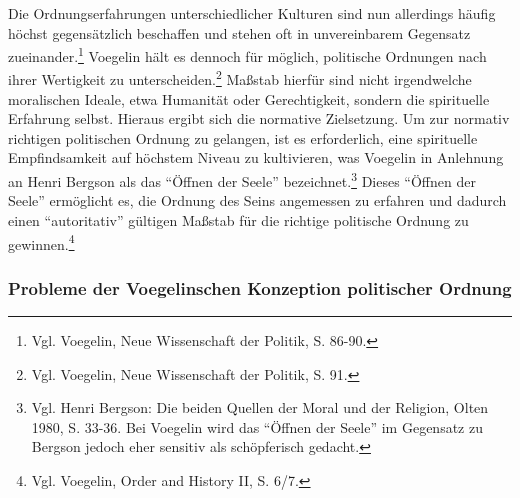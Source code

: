 Die Ordnungserfahrungen unterschiedlicher Kulturen sind nun allerdings häufig
höchst gegensätzlich beschaffen und stehen oft in unvereinbarem Gegensatz
zueinander.\footnote{Vgl. Voegelin, Neue Wissenschaft der Politik, S. 86-90.}
Voegelin hält es dennoch für möglich, politische Ordnungen nach ihrer
Wertigkeit zu unterscheiden.\footnote{Vgl.  Voegelin, Neue Wissenschaft der
  Politik, S. 91.} Maßstab hierfür sind nicht irgendwelche moralischen Ideale,
etwa Humanität oder Gerechtigkeit, sondern die spirituelle Erfahrung selbst.
Hieraus ergibt sich die normative Zielsetzung. Um zur normativ richtigen
politischen Ordnung zu gelangen, ist es erforderlich, eine spirituelle
Empfindsamkeit auf höchstem Niveau zu kultivieren, was Voegelin in Anlehnung
an Henri Bergson als das "`Öffnen der Seele"' bezeichnet.\footnote{Vgl. Henri
  Bergson: Die beiden Quellen der Moral und der Religion, Olten 1980, S. 33-36.
  Bei Voegelin wird das "`Öffnen der Seele"' im Gegensatz zu Bergson jedoch
  eher sensitiv als schöpferisch gedacht.} Dieses "`Öffnen der Seele"'
ermöglicht es, die Ordnung des Seins angemessen zu erfahren und dadurch einen
"`autoritativ"' gültigen Maßstab für die richtige politische Ordnung zu
gewinnen.\footnote{Vgl. Voegelin, Order and History II, S. 6/7.}

\subsubsection{Probleme der Voegelinschen Konzeption politischer Ordnung}

